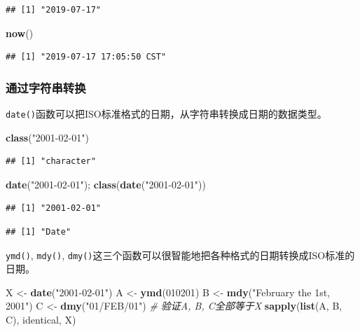 \documentclass[]{book}
\newenvironment{Shaded}{\begin{snugshade}}{\end{snugshade}}
\newcommand{\CommentTok}[1]{\textcolor[rgb]{0.56,0.35,0.01}{\textit{#1}}}
\newcommand{\DecValTok}[1]{\textcolor[rgb]{0.00,0.00,0.81}{#1}}
\newcommand{\KeywordTok}[1]{\textcolor[rgb]{0.13,0.29,0.53}{\textbf{#1}}}
\newcommand{\NormalTok}[1]{#1}
\newcommand{\StringTok}[1]{\textcolor[rgb]{0.31,0.60,0.02}{#1}}
\begin{document}
\begin{verbatim}
## [1] "2019-07-17"
\end{verbatim}

\begin{Shaded}
\begin{Highlighting}[]
\KeywordTok{now}\NormalTok{()}
\end{Highlighting}
\end{Shaded}

\begin{verbatim}
## [1] "2019-07-17 17:05:50 CST"
\end{verbatim}

\subsubsection{通过字符串转换}

\texttt{date()}函数可以把ISO标准格式的日期，从字符串转换成日期的数据类型。

\begin{Shaded}
\begin{Highlighting}[]
\KeywordTok{class}\NormalTok{(}\StringTok{"2001-02-01"}\NormalTok{)}
\end{Highlighting}
\end{Shaded}

\begin{verbatim}
## [1] "character"
\end{verbatim}

\begin{Shaded}
\begin{Highlighting}[]
\KeywordTok{date}\NormalTok{(}\StringTok{"2001-02-01"}\NormalTok{); }\KeywordTok{class}\NormalTok{(}\KeywordTok{date}\NormalTok{(}\StringTok{"2001-02-01"}\NormalTok{))}
\end{Highlighting}
\end{Shaded}

\begin{verbatim}
## [1] "2001-02-01"
\end{verbatim}

\begin{verbatim}
## [1] "Date"
\end{verbatim}

\texttt{ymd()}, \texttt{mdy()}, \texttt{dmy()}这三个函数可以很智能地把各种格式的日期转换成ISO标准的日期。

\begin{Shaded}
\begin{Highlighting}[]
\NormalTok{X <-}\StringTok{ }\KeywordTok{date}\NormalTok{(}\StringTok{"2001-02-01"}\NormalTok{)}
\NormalTok{A <-}\StringTok{ }\KeywordTok{ymd}\NormalTok{(}\DecValTok{010201}\NormalTok{)}
\NormalTok{B <-}\StringTok{  }\KeywordTok{mdy}\NormalTok{(}\StringTok{"February the 1st, 2001"}\NormalTok{)}
\NormalTok{C <-}\StringTok{ }\KeywordTok{dmy}\NormalTok{(}\StringTok{"01/FEB/01"}\NormalTok{)}
\CommentTok{# 验证A, B, C全部等于X}
\KeywordTok{sapply}\NormalTok{(}\KeywordTok{list}\NormalTok{(A, B, C), identical, X)}
\end{Highlighting}
\end{Shaded}
\end{document}
